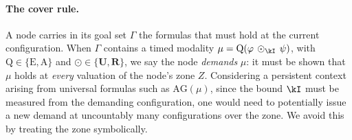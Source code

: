 
\paragraph{The cover rule.}
A node carries in its goal set $\Gamma$ the formulas that must hold at the current
configuration. When $\Gamma$ contains a timed modality
$\mu=\mathrm{Q}(\varphi\,\odot_\kI\,\psi)$, with $\mathrm{Q}\in\{\mathrm{E},\mathrm{A}\}$ and
$\odot\in\{\mathbf{U},\mathbf{R}\}$, we say the node \emph{demands} $\mu$: it must be shown that
$\mu$ holds at \emph{every} valuation of the node's zone $Z$. Considering a persistent context arising from universal formulas such as $\mathrm{AG}(\mu)$, since the bound $\kI$ must be measured from the demanding configuration, one would need to potentially issue a new demand at uncountably many configurations over the zone. We avoid this by treating the zone symbolically. 


